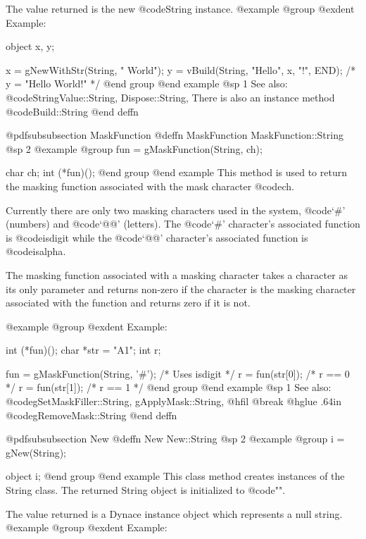 The value returned is the new @code{String} instance.
@example
@group
@exdent Example:

object  x, y;

x = gNewWithStr(String, " World");
y = vBuild(String, "Hello", x, "!", END);
/*  y = "Hello World!"  */
@end group
@end example
@sp 1
See also:  @code{StringValue::String, Dispose::String,}
There is also an instance method @code{Build::String}
@end deffn





@pdfsubsubsection {MaskFunction}
@deffn {MaskFunction} MaskFunction::String
@sp 2
@example
@group
fun = gMaskFunction(String, ch);

char    ch;
int     (*fun)();
@end group
@end example
This method is used to return the masking function associated with
the mask character @code{ch}.

Currently there are only two masking characters used in the system,
@code{`#'} (numbers) and @code{`@@'} (letters).  The @code{`#'}
character's associated function is @code{isdigit} while the @code{`@@'}
character's associated function is @code{isalpha}.

The masking function associated with a masking character takes a
character as its only parameter and returns non-zero if the character
is the masking character associated with the function and returns zero
if it is not.

@example
@group
@exdent Example:

int     (*fun)();
char    *str = "A1";
int     r;

fun = gMaskFunction(String, '#');       /*  Uses isdigit  */
r = fun(str[0]);                        /*  r == 0        */
r = fun(str[1]);                        /*  r == 1        */
@end group
@end example
@sp 1
See also:  @code{gSetMaskFiller::String, gApplyMask::String,}
@hfil @break @hglue .64in      @code{gRemoveMask::String}
@end deffn












@pdfsubsubsection {New}
@deffn {New} New::String
@sp 2
@example
@group
i = gNew(String);

object  i;
@end group
@end example
This class method creates instances of the String class.  The returned
String object is initialized to @code{""}.

The value returned is a Dynace instance object which represents a null string.
@example
@group
@exdent Example:

